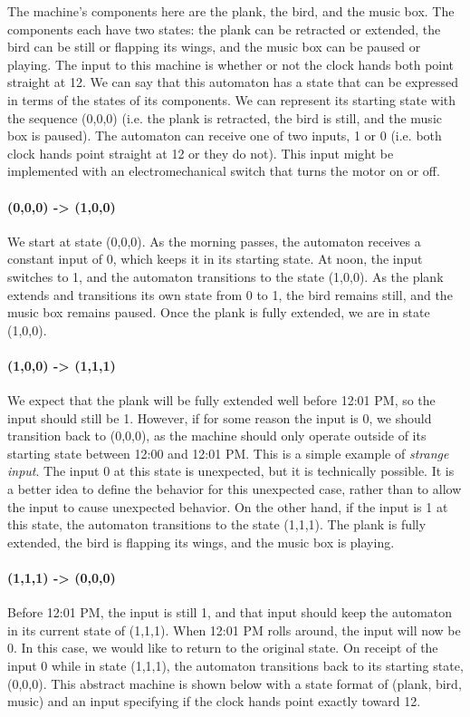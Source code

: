 The machine's components here are the plank, the bird, and the music box. The components each have two states: the plank can be retracted or extended, the bird can be still or flapping its wings, and the music box can be paused or playing. The input to this machine is whether or not the clock hands both point straight at 12. We can say that this automaton has a state that can be expressed in terms of the states of its components. We can represent its starting state with the sequence (0,0,0) (i.e. the plank is retracted, the bird is still, and the music box is paused). The automaton can receive one of two inputs, 1 or 0 (i.e. both clock hands point straight at 12 or they do not). This input might be implemented with an electromechanical switch that turns the motor on or off.

\paragraph{(0,0,0) -> (1,0,0)} We start at state (0,0,0). As the morning passes, the automaton receives a constant input of 0, which keeps it in its starting state. At noon, the input switches to 1, and the automaton transitions to the state (1,0,0). As the plank extends and transitions its own state from 0 to 1, the bird remains still, and the music box remains paused. Once the plank is fully extended, we are in state (1,0,0).

\paragraph{(1,0,0) -> (1,1,1)} We expect that the plank will be fully extended well before 12:01 PM, so the input should still be 1. However, if for some reason the input is 0, we should transition back to (0,0,0), as the machine should only operate outside of its starting state between 12:00 and 12:01 PM. This is a simple example of \textit{strange input}. The input 0 at this state is unexpected, but it is technically possible. It is a better idea to define the behavior for this unexpected case, rather than to allow the input to cause unexpected behavior. On the other hand, if the input is 1 at this state, the automaton transitions to the state (1,1,1). The plank is fully extended, the bird is flapping its wings, and the music box is playing.

\paragraph{(1,1,1) -> (0,0,0)} Before 12:01 PM, the input is still 1, and that input should keep the automaton in its current state of (1,1,1). When 12:01 PM rolls around, the input will now be 0. In this case, we would like to return to the original state. On receipt of the input 0 while in state (1,1,1), the automaton transitions back to its starting state, (0,0,0). This abstract machine is shown below with a state format of (plank, bird, music) and an input specifying if the clock hands point exactly toward 12.

